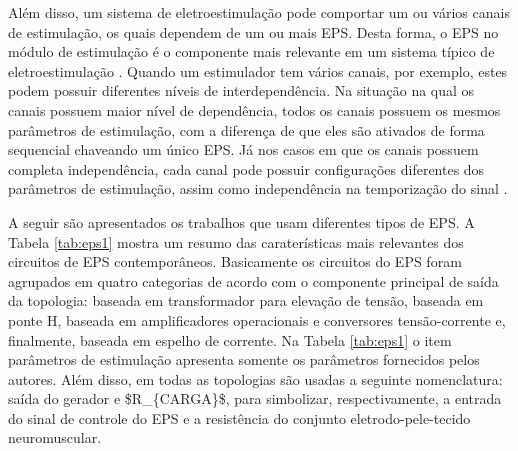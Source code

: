 Além disso, um sistema de eletroestimulação pode comportar um ou vários canais de estimulação, os quais dependem de um ou mais \acrshort{EPS}. Desta forma, o \acrshort{EPS} no módulo de estimulação é o componente mais relevante em um sistema típico de eletroestimulação \cite{Ilic1994, Velloso2007c}. Quando um estimulador tem vários canais, por exemplo, estes podem possuir diferentes níveis de interdependência. Na situação na qual os canais possuem maior nível de dependência, todos os canais possuem os mesmos parâmetros de estimulação, com a diferença de que eles são ativados de forma sequencial chaveando um único \acrshort{EPS}. Já nos casos em que os canais possuem completa independência, cada canal pode possuir configurações diferentes dos parâmetros de estimulação, assim como independência na temporização do sinal \cite{Faria2006,Wu2002, Quark2013}. 

A seguir são apresentados os trabalhos que usam diferentes tipos de \acrshort{EPS}. A Tabela \ref{tab:eps1} mostra um resumo das caraterísticas mais relevantes dos circuitos de \acrshort{EPS} contemporâneos. Basicamente os circuitos do \acrshort{EPS} foram agrupados em quatro categorias de acordo com o componente principal de saída da topologia: baseada em transformador para elevação de tensão, baseada em ponte H, baseada em amplificadores operacionais e conversores tensão-corrente e, finalmente, baseada em espelho de corrente. Na Tabela \ref{tab:eps1} o item parâmetros de estimulação apresenta somente os parâmetros fornecidos pelos autores. Além disso, em todas as topologias são usadas a seguinte nomenclatura: saída do gerador e \acrshort{$R_{CARGA}$}, para simbolizar, respectivamente, a entrada do sinal de controle do \acrshort{EPS} e a resistência do conjunto eletrodo-pele-tecido neuromuscular.

